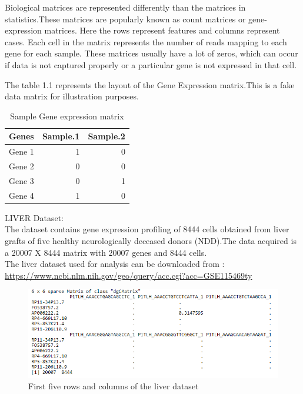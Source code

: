\documentclass{sydneythesis}
\begin{document}
Biological matrices are represented differently than the matrices in
statistics.These matrices are popularly known as count matrices or
gene-expression matrices. Here the rows represent features and columns
represent cases. Each cell in the matrix represents the number of reads
mapping to each gene for each sample. These matrices usually have a lot
of zeros, which can occur if data is not captured properly or a
particular gene is not expressed in that cell.

The table 1.1 represents the layout of the Gene Expression matrix.This
is a fake data matrix for illustration purposes.

\begin{table}[t]

\caption{\label{tab:unnamed-chunk-3}Sample Gene expression matrix}
\centering
\begin{tabular}{lrr}
\toprule
Genes & Sample.1 & Sample.2\\
\midrule
Gene 1 & 1 & 0\\
Gene 2 & 0 & 0\\
Gene 3 & 0 & 1\\
Gene 4 & 1 & 0\\
\bottomrule
\end{tabular}
\end{table}

LIVER Dataset:\\
The dataset contains gene expression profiling of 8444 cells obtained
from liver grafts of five healthy neurologically deceased donors
(NDD).The data acquired is a 20007 X 8444 matrix with 20007 genes and
8444 cells.\\
The liver dataset used for analysis can be downloaded from :
\url{https://www.ncbi.nlm.nih.gov/geo/query/acc.cgi?acc=GSE115469ty}

\begin{figure}

{\centering \includegraphics[width=9.68in]{livermatrix} 

}

\caption{First five rows and columns of the liver dataset}\label{fig:unnamed-chunk-4}
\end{figure}
\end{document}
